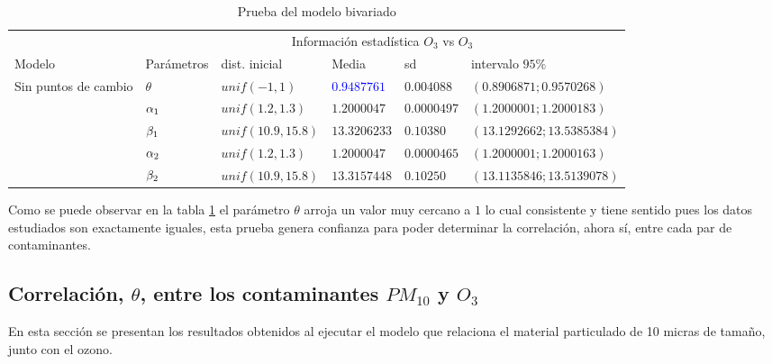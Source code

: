\begin{table}[!h]
\centering
\begin{tabular}{|l|l|l|l|l|l|}
\hline
& \multicolumn{5}{c|}{Información estadística $O_3$ vs $O_3$} \\
\cline{2-6}
Modelo & Parámetros & dist. inicial  & Media & sd  &   intervalo $95 \%$\\
\hline \hline
\multirow{5}{1.5cm}{Sin puntos de cambio } & $\theta$ & $unif(-1,1)$ & \textcolor{blue}{$0.9487761$} & $0.004088$ & $(0.8906871 ;0.9570268 )$ \\ \cline{2-6}
& $\alpha_1$& $unif(1.2,1.3)$ & $1.2000047$ & $0.0000497$ & $( 1.2000001;1.2000183)$\\  \cline{2-6}
& $\beta_1$& $unif(10.9,15.8)$ & $13.3206233$ & $0.10380$ & $(13.1292662;13.5385384)$\\  \cline{2-6}
& $\alpha_2$& $unif(1.2,1.3)$ & $1.2000047$ & $0.0000465$ & $(1.2000001;1.2000163)$\\  \cline{2-6}
& $\beta_2$& $unif(10.9,15.8)$ & $13.3157448$ & $0.10250$ & $(13.1135846;13.5139078)$\\  \cline{1-6}

\end{tabular}
\caption{Prueba del modelo bivariado}
\label{infoestad_prueba}
\end{table}

Como se puede observar en la tabla \ref{infoestad_prueba} el parámetro $\theta$ arroja un valor muy cercano a $1$ lo cual consistente y tiene sentido pues los datos estudiados son exactamente iguales, esta prueba genera confianza para poder determinar la correlación, ahora sí, entre cada par de contaminantes. 

\newpage
\subsection{Correlación, $\theta$, entre los contaminantes $PM_{10}$ y $O_3$ }

En esta sección se presentan los resultados obtenidos al ejecutar el modelo que relaciona el material particulado de 10 micras de tamaño, junto con el ozono. 

